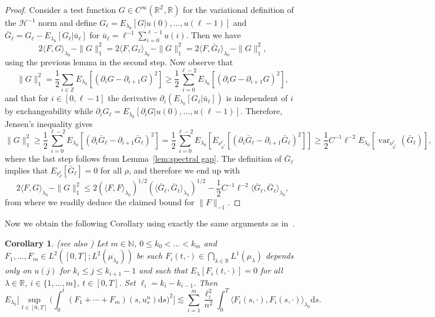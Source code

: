\documentclass[11pt, a4paper]{article}
\newcommand{\cdummy}{\cdot}
\newcommand{\mathd}{\mathrm{d}}
\newcommand{\tmop}[1]{\ensuremath{\operatorname{#1}}}
\newtheorem{corollary}[theorem]{Corollary}
\newcommand{\CH}{\mathscr{H}}
\newcommand{\N}{\mathbb{N}}
\newcommand{\1}{\mathbf{1}}
\begin{document}
\begin{proof}
  Consider a test function $G \in C^{\infty} (\mathbb{R}^{\mathbb{Z}},
  \mathbb{R})$ for the variational definition of the $\CH^{- 1}$ norm and
  define $G_{\ell} = E_{\lambda_0} [G|u(0), \ldots, u(\ell - 1)]$ and
  $\bar{G}_{\ell} = G_{\ell} - E_{\lambda_0} [G_{\ell} | \bar{u}_{\ell}]$ for
  $\bar{u}_{\ell} = \ell^{- 1} \sum_{i = 0}^{\ell - 1} u(i)$. Then we have
  \[ 2 \langle F, G \rangle_{\lambda_0} - \| G \|_1^2 = 2 \langle F, G_{\ell}
     \rangle_{\lambda_0} - \| G \|_1^2 = 2 \langle F, \bar{G}_{\ell}
     \rangle_{\lambda_0} - \| G \|_1^2, \]
  using the previous lemma in the second step. Now observe that
  \[ \| G \|_1^2 = \frac{1}{2} \sum_{i \in \mathbb{Z}} E_{\lambda_0}
     [(\partial_i G - \partial_{i + 1} G)^2] \geqslant \frac{1}{2} \sum_{i =
     0}^{\ell - 2} E_{\lambda_0} [(\partial_i G - \partial_{i + 1} G)^2], \]
  and that for $i \in [0, \ell - 1]$ the derivative $\partial_i (E_{\lambda_0}
  [G_{\ell} | \bar{u}_{\ell}])$ is independent of $i$ by exchangeability while
  $\partial_i G_{\ell} = E_{\lambda_0} [\partial_i G|u(0), \ldots, u(\ell -
  1)]$. Therefore, Jensen's inequality gives
  \[ \| G \|_1^2 \geqslant \frac{1}{2} \sum_{i = 0}^{\ell - 2} E_{\lambda_0} [(\partial_i
     \bar{G}_{\ell} - \partial_{i + 1} \bar{G}_{\ell})^2] =  \frac{1}{2}\sum_{i = 0}^{\ell
     - 2} E_{\lambda_0} [E_{\nu^{\ell}_{\bar{u}^\ell}} [(\partial_i \bar{G}_{\ell} -
     \partial_{i + 1} \bar{G}_{\ell})^2]] \geqslant  \frac{1}{2} C^{- 1} \ell^{- 2}
     E_{\lambda_0} [\tmop{var}_{\nu^{\ell}_{\bar{u}^\ell}} (\bar{G}_{\ell})], \]
  where the last step follows from
  Lemma~\ref{lem:spectral gap}.
  The definition of $\bar{G}_{\ell}$ implies that $E_{\nu^{\ell}_{\rho}}
  [\bar{G}_{\ell}] = 0$ for all $\rho$, and therefore we end up with
  \[ 2 \langle F, G \rangle_{\lambda_0} - \| G \|_1^2 \leqslant 2 (\langle F,
     F \rangle_{\lambda_0})^{1 / 2} (\langle \bar{G}_{\ell}, \bar{G}_{\ell}
     \rangle_{\lambda_0})^{1 / 2} -  \frac{1}{2} C^{- 1} \ell^{- 2} \langle \bar{G}_{\ell},
     \bar{G}_{\ell} \rangle_{\lambda_0}, \]
  from where we readily deduce the claimed bound for $\| F \|_{- 1}$.
\end{proof}

Now we obtain the following Corollary using exactly the same arguments as in~\cite{bib:goncalvesJara}.

\begin{corollary}
  \label{cor:GJ corollary 1}(see also \cite[Corollary~1]{bib:goncalvesJara})
  Let $m \in \N$, $0 \leqslant k_0 < \ldots < k_m $ and $F_1, \ldots, F_m \in L^2( [0, T]
  ; L^2(\mu_{\lambda_0}))$ be such $F_i
  (t, \cdummy) \in \bigcap_{\lambda \in \mathbb{R}} L^1 ({\mu}_{\lambda})$ depends only on $u(j)$ for $k_i \leqslant j
  \leqslant k_{i + 1} - 1$ and such that $E_{\lambda} [F_i (t, \cdummy)] = 0$
  for all $\lambda \in \mathbb{R}$, $i \in \{ 1, \ldots, m \}$, $t \in [0,
  T]$. Set $\ell_i = k_i - k_{i - 1}$. Then
  \[ E_{\lambda_0} \Big[ \sup_{t \in [0, T]} \Big( \int_0^t (F_1 + \cdots +
     F_m) (s, u^n_s) \mathd s \Big)^2 \Big] \lesssim \sum_{i = 1}^m
     \frac{\ell_i^2}{n^2} \int_0^T \langle F_i (s, \cdummy), F_i (s, \cdummy)
     \rangle_{\lambda_0} \mathd s. \]
\end{corollary}
\end{document}
